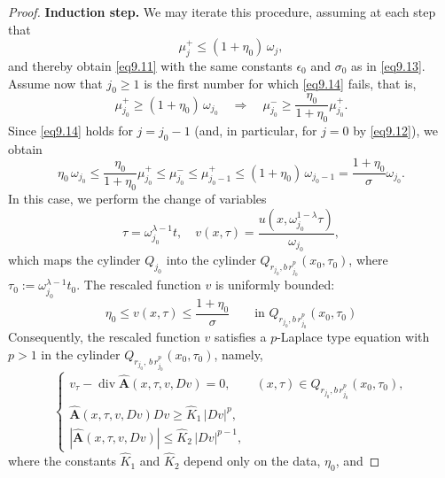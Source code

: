 \documentclass[a4paper,11pt,fullpage]{article}
\numberwithin{equation}{section}
\begin{document}
\begin{proof}
\medskip
\noindent\textbf{Induction step.}
We may iterate this procedure, assuming at each step that
\begin{equation}\label{eq9.14}
\mu^+_j\leqslant (1+\eta_0)\,\omega_j,
\end{equation}
and thereby obtain \eqref{eq9.11} with the same constants $\epsilon_0$ and $\sigma_0$ as in \eqref{eq9.13}. Assume now that $j_0\geqslant 1$ is the first number for which \eqref{eq9.14} fails, that is,
\begin{equation}\label{eq9.15}
\mu^+_{j_0}\geqslant (1+\eta_0)\,\omega_{j_0}\quad \Rightarrow \quad \mu^-_{j_0}\geqslant \frac{\eta_0}{1+\eta_0}\mu^+_{j_0}.
\end{equation}
Since \eqref{eq9.14} holds for $j=j_0-1$ (and, in particular, for $j=0$ by \eqref{eq9.12}), we obtain
\begin{equation}\label{eq9.16}
\eta_0\,\omega_{j_0}\leqslant \frac{\eta_0}{1+\eta_0}\mu^+_{j_0}\leqslant \mu^-_{j_0}\leqslant \mu^+_{j_0-1}\leqslant (1+\eta_0)\,\omega_{j_0-1}=\frac{1+\eta_0}{\sigma}\omega_{j_0}.
\end{equation}
In this case, we perform the change of variables
\begin{equation}
\tau=\omega_{j_0}^{\lambda-1}t,\quad v(x,\tau)=\frac{u(x,\omega_{j_0}^{1-\lambda}\tau)}{\omega_{j_0}},
\end{equation}
which maps the cylinder $Q_{j_0}$ into the cylinder $Q_{r_{j_0}, b\,r^{p}_{j_0}}(x_0, \tau_0)$, where $\tau_0:=\omega_{j_0}^{\lambda-1}t_0$. The rescaled function $v$ is uniformly bounded:
\begin{equation}\label{eq9.17}
\eta_0\leqslant v(x,\tau)\leqslant\frac{1+\eta_0}{\sigma}\qquad \text{in } Q_{r_{j_0}, b\,r^{p}_{j_0}}(x_0, \tau_0)
\end{equation}
Consequently, the rescaled function $v$ satisfies a $p$-Laplace type equation with
$p>1$ in the cylinder $Q_{r_{j_0},\,b\,r_{j_0}^{p}}(x_0,\tau_0)$, namely,
\begin{equation*}
\begin{cases}
v_\tau - \operatorname{div}\hat{\mathbf{A}}(x, \tau, v, D v)=0,\qquad (x, \tau)\in Q_{r_{j_0}, b\,r^{p}_{j_0}}(x_0, \tau_0),\\
\hat{\mathbf{A}}(x, \tau, v, D v) D v\geqslant \hat{K}_1\,|D v|^{p},\\
|\hat{\mathbf{A}}(x, \tau, v, D v)|\leqslant \hat{K}_2\,|D v|^{p-1},
\end{cases}
\end{equation*}
where the constants $\hat{K}_1$ and $\hat{K}_2$ depend only on the data, $\eta_0$, and

\end{proof}
\end{document}
